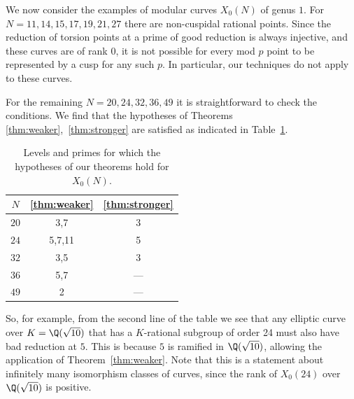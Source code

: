 \documentclass[12pt]{amsart}
\begin{document}
\begin{exm}
  We now consider the examples of modular curves $X_0(N)$ of genus $1$.
  For $N = 11, 14, 15, 17, 19, 21, 27$ there are non-cuspidal rational points.
  Since the reduction of torsion points at a prime of good reduction is always
  injective, and these curves are of rank $0$, it is not possible for every
  mod $p$ point to be represented by a cusp for any such $p$.  In particular, our techniques do not apply to these curves.

  For the remaining $N = 20, 24, 32, 36, 49$ it is straightforward to check
  the conditions.  We find that the hypotheses of Theorems
  \ref{thm:weaker},~\ref{thm:stronger}
  are satisfied as indicated in Table~\ref{table:x0}.

  \begin{table}[h]
    \caption{Levels and primes for which the hypotheses of our theorems hold for
      $X_0(N)$.}
    \begin{tabular}{|c|c|c|}
      \hline
      $N$&\ref{thm:weaker}&\ref{thm:stronger}\\ \hline
      $20$&3,7&3\\ \hline
      $24$&5,7,11&5\\ \hline
      $32$&3,5&3\\ \hline
      $36$&5,7&---\\ \hline
      $49$&2&---\\ \hline
    \end{tabular}\label{table:x0}
  \end{table}
\end{exm}

So, for example, from the second line of the table we see that any elliptic curve over $K=\Q(\sqrt{10})$ that has a $K$-rational subgroup of order 24 must also have bad reduction at $5$.  This is because $5$ is ramified in $\Q(\sqrt{10})$, allowing the application of Theorem~\ref{thm:weaker}.  Note that this is a statement about infinitely many isomorphism classes of curves, since the rank of $X_0(24)$ over $\Q(\sqrt{10})$ is positive.
\end{document}
